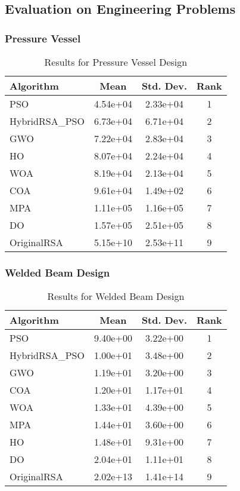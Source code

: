 \documentclass[12pt]{article}
\begin{document}
\subsection{Evaluation on Engineering Problems}
\subsubsection{Pressure Vessel}
\begin{table}[H]
\centering
\caption{Results for Pressure Vessel Design}
\begin{tabular}{|l|c|c|c|}
\hline
\textbf{Algorithm} & \textbf{Mean} & \textbf{Std. Dev.} & \textbf{Rank} \\
\hline
PSO & 4.54e+04 & 2.33e+04 & 1 \\
HybridRSA\_PSO & 6.73e+04 & 6.71e+04 & 2 \\
GWO & 7.22e+04 & 2.83e+04 & 3 \\
HO & 8.07e+04 & 2.24e+04 & 4 \\
WOA & 8.19e+04 & 2.13e+04 & 5 \\
COA & 9.61e+04 & 1.49e+02 & 6 \\
MPA & 1.11e+05 & 1.16e+05 & 7 \\
DO & 1.57e+05 & 2.51e+05 & 8 \\
OriginalRSA & 5.15e+10 & 2.53e+11 & 9 \\
\hline
\end{tabular}
\end{table}

\subsubsection{Welded Beam Design}
\begin{table}[H]
\centering
\caption{Results for Welded Beam Design}
\begin{tabular}{|l|c|c|c|}
\hline
\textbf{Algorithm} & \textbf{Mean} & \textbf{Std. Dev.} & \textbf{Rank} \\
\hline
PSO & 9.40e+00 & 3.22e+00 & 1 \\
HybridRSA\_PSO & 1.00e+01 & 3.48e+00 & 2 \\
GWO & 1.19e+01 & 3.20e+00 & 3 \\
COA & 1.20e+01 & 1.17e+01 & 4 \\
WOA & 1.33e+01 & 4.39e+00 & 5 \\
MPA & 1.44e+01 & 3.60e+00 & 6 \\
HO & 1.48e+01 & 9.31e+00 & 7 \\
DO & 2.04e+01 & 1.11e+01 & 8 \\
OriginalRSA & 2.02e+13 & 1.41e+14 & 9 \\
\hline
\end{tabular}
\end{table}
\end{document}
